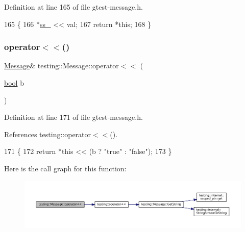 Definition at line 165 of file gtest-\/message.\+h.


\begin{DoxyCode}
165                                                \{
166     *\hyperlink{classtesting_1_1Message_ad46fbddd62cde8526744ae32e3322b76}{ss\_} << val;
167     \textcolor{keywordflow}{return} *\textcolor{keyword}{this};
168   \}
\end{DoxyCode}
\mbox{\label{classtesting_1_1Message_a3e1e04f23b1bdfe18adfd59928296346}} 
\subsubsection{\texorpdfstring{operator$<$$<$()}{operator<<()}\hspace{0.1cm}{\footnotesize\ttfamily [4/6]}}
{\footnotesize\ttfamily \hyperlink{classtesting_1_1Message}{Message}\& testing\+::\+Message\+::operator$<$$<$ (\begin{DoxyParamCaption}\item[{\hyperlink{classbool}{bool}}]{b }\end{DoxyParamCaption})\hspace{0.3cm}{\ttfamily [inline]}}



Definition at line 171 of file gtest-\/message.\+h.



References testing\+::operator$<$$<$().


\begin{DoxyCode}
171                                \{
172     \textcolor{keywordflow}{return} *\textcolor{keyword}{this} << (b ? \textcolor{stringliteral}{"true"} : \textcolor{stringliteral}{"false"});
173   \}
\end{DoxyCode}
Here is the call graph for this function\+:
\nopagebreak
\begin{figure}[H]
\begin{center}
\leavevmode
\includegraphics[width=350pt]{classtesting_1_1Message_a3e1e04f23b1bdfe18adfd59928296346_cgraph}
\end{center}
\end{figure}
\mbox{\label{classtesting_1_1Message_ac0db9c22535b28bc863bfd0a1fdf7e14}} 
